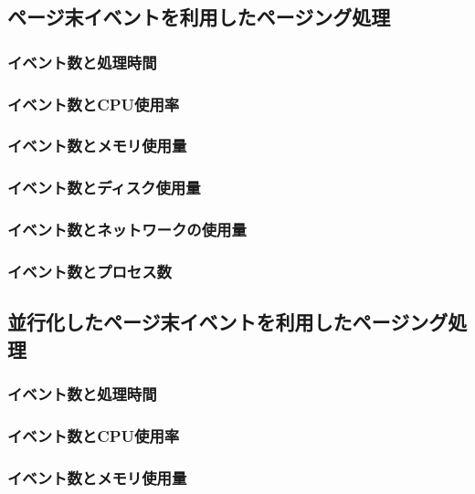 \documentclass[../../main]{subfiles}
\begin{document}
    \subsection{ページ末イベントを利用したページング処理}\label{subsec:result-paging-last}
    \subsubsection{イベント数と処理時間}\label{subsubsec:result-paging-last-time}
    \subsubsection{イベント数とCPU使用率}\label{subsubsec:result-paging-last-cpu}
    \subsubsection{イベント数とメモリ使用量}\label{subsubsec:result-paging-last-memory}
    \subsubsection{イベント数とディスク使用量}\label{subsubsec:result-paging-last-disk}
    \subsubsection{イベント数とネットワークの使用量}\label{subsubsec:result-paging-last-network}
    \subsubsection{イベント数とプロセス数}\label{subsubsec:result-paging-last-process}

    \subsection{並行化したページ末イベントを利用したページング処理}\label{subsec:result-paging-last-async}
    \subsubsection{イベント数と処理時間}\label{subsubsec:result-paging-last-async-time}
    \subsubsection{イベント数とCPU使用率}\label{subsubsec:result-paging-last-async-cpu}
    \subsubsection{イベント数とメモリ使用量}\label{subsubsec:result-paging-last-async-memory}
\end{document}
